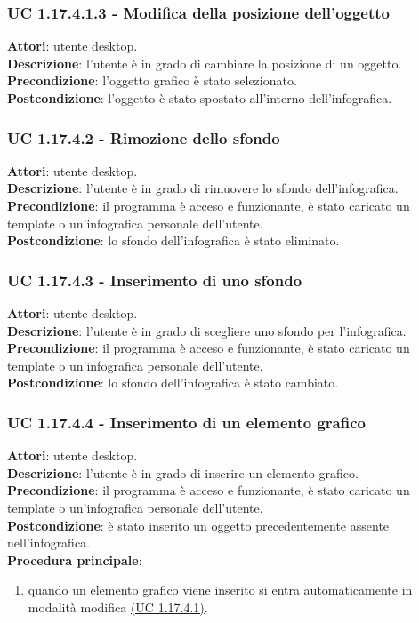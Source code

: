 \subsubsection{UC 1.17.4.1.3 - Modifica della posizione dell'oggetto}{
	\label{uc1.17.4.1.3}
	\textbf{Attori}: utente desktop. \\
	\textbf{Descrizione}: l'utente è in grado di cambiare la posizione di un oggetto. \\
	\textbf{Precondizione}: l'oggetto grafico è stato selezionato.\\
	\textbf{Postcondizione}: l'oggetto è stato spostato all’interno dell’infografica.	\\
	}
\subsubsection{UC 1.17.4.2 - Rimozione dello sfondo}{
	\label{uc1.17.4.2}
	\textbf{Attori}: utente desktop. \\
	\textbf{Descrizione}: l'utente è in grado di rimuovere lo sfondo dell’infografica. \\
	\textbf{Precondizione}: il programma è acceso e funzionante, è stato caricato un template o un'infografica personale dell'utente.	\\
	\textbf{Postcondizione}: lo sfondo dell'infografica è stato eliminato.	\\
	}
\subsubsection{UC 1.17.4.3 - Inserimento di uno sfondo}{
	\label{uc1.17.4.3}
	\textbf{Attori}: utente desktop. \\
	\textbf{Descrizione}: l'utente è in grado di scegliere uno sfondo per l'infografica. \\
	\textbf{Precondizione}: il programma è acceso e funzionante, è stato caricato un template o un'infografica personale dell'utente.	\\
	\textbf{Postcondizione}: lo sfondo dell'infografica è stato cambiato.	\\
	}
\subsubsection{UC 1.17.4.4 - Inserimento di un elemento grafico}{
	\label{uc1.17.4.4}
	\textbf{Attori}: utente desktop. \\
	\textbf{Descrizione}: l'utente è in grado di inserire un elemento grafico. \\
	\textbf{Precondizione}: il programma è acceso e funzionante, è stato caricato un template o un'infografica personale dell'utente.	\\
	\textbf{Postcondizione}: è stato inserito un oggetto precedentemente assente nell'infografica.	\\
	\textbf{Procedura principale}:
	\begin{enumerate}
		\item quando un elemento grafico viene inserito si entra automaticamente in modalità modifica \hyperref[uc1.17.4.1]{(UC 1.17.4.1)}.
	\end{enumerate}
	}
